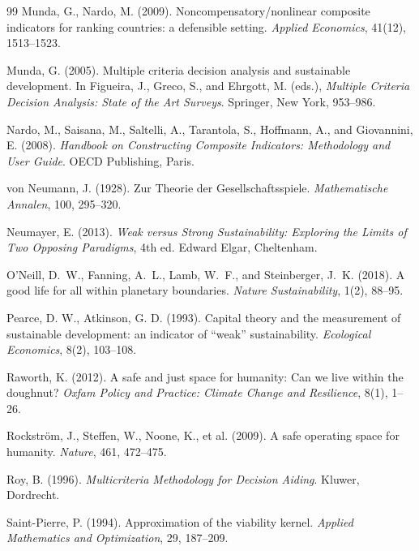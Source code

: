 \begin{thebibliography}{99}
 Munda, G., Nardo, M. (2009). Noncompensatory/nonlinear composite indicators for ranking countries: a defensible setting. \emph{Applied Economics}, 41(12), 1513--1523.

 Munda, G. (2005). Multiple criteria decision analysis and sustainable development. In Figueira, J., Greco, S., and Ehrgott, M. (eds.), \emph{Multiple Criteria Decision Analysis: State of the Art Surveys}. Springer, New York, 953--986.

 Nardo, M., Saisana, M., Saltelli, A., Tarantola, S., Hoffmann, A., and Giovannini, E. (2008). \emph{Handbook on Constructing Composite Indicators: Methodology and User Guide}. OECD Publishing, Paris.

 von Neumann, J. (1928). Zur Theorie der Gesellschaftsspiele. \emph{Mathematische Annalen}, 100, 295--320.

 Neumayer, E. (2013). \emph{Weak versus Strong Sustainability: Exploring the Limits of Two Opposing Paradigms}, 4th ed. Edward Elgar, Cheltenham.

 O'Neill, D.~W., Fanning, A.~L., Lamb, W.~F., and Steinberger, J.~K. (2018). A good life for all within planetary boundaries. \emph{Nature Sustainability}, 1(2), 88--95.

 Pearce, D. W., Atkinson, G. D. (1993). Capital theory and the measurement of sustainable development: an indicator of ``weak'' sustainability. \emph{Ecological Economics}, 8(2), 103--108.

 Raworth, K. (2012). A safe and just space for humanity: Can we live within the doughnut? \emph{Oxfam Policy and Practice: Climate Change and Resilience}, 8(1), 1--26.

 Rockstr\"om, J., Steffen, W., Noone, K., et al. (2009). A safe operating space for humanity. \emph{Nature}, 461, 472--475.

 Roy, B. (1996). \emph{Multicriteria Methodology for Decision Aiding}. Kluwer, Dordrecht.

 Saint-Pierre, P. (1994). Approximation of the viability kernel. \emph{Applied Mathematics and Optimization}, 29, 187--209.


\end{thebibliography}

